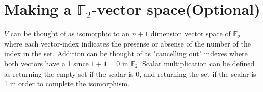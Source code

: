 \section{Making a $\mathbb{F}_2$-vector space(Optional)}
$V$ can be thought of as isomorphic to an $n+1$ dimension vector space of $\mathbb{F}_2$
where each vector-index indicates the presense or absense of the number of the index in the set.
Addition can be thought of as "cancelling out" indexes where both vectors have a 1 since
$1+1=0$ in $\mathbb{F}_2$.
Scalar multiplication can be defined as returning the empty set if the scalar is 0,
and returning the set if the scalar is 1 in order to complete the isomorphism.
